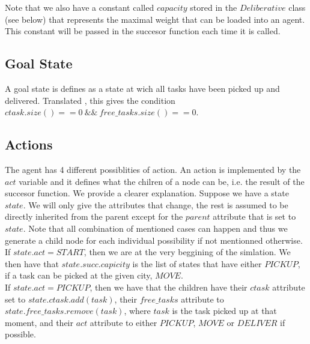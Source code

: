 \documentclass[11pt]{article}
\begin{document}
Note that we also have a constant called $capacity$ stored in the $Deliberative$ class (see below) that represents the maximal weight that can be loaded into an agent. This constant will be passed in the succesor function each time it is called.

\subsection{Goal State}
A goal state is defines as a state at wich all tasks have been picked up and delivered. Translated , this gives the condition $ctask.size() == 0\ \&\&\ free\_tasks.size() == 0$. 

\subsection{Actions}
The agent has 4 different possiblities of action. An action is implemented by the $act$ variable and it defines what the chilren of a node can be, i.e. the result of the succesor function. We provide a clearer explanation. Suppose we have a state $state$. We will only give the attributes that change, the rest is assumed to be directly inherited from the parent except for the $parent$ attribute that is set to $state$. Note that all combination of mentioned cases can happen and thus we generate a child node for each individual possibility if not mentionned otherwise.\\
If $state.act = START$, then we are at the very beggining of the simlation. We then have that $state.succ.capicity$ is the list of states that have either $PICKUP$, if a task can be picked at the given city, $MOVE$.\\
If $state.act = PICKUP$, then we have that the children have their $ctask$ attribute set to $state.ctask.add(task)$, their $free\_tasks$ attribute to $state.free\_tasks.remove(task)$, where $task$ is the task picked up at that moment, and their $act$ attribute to either $PICKUP$, $MOVE$ or $DELIVER$ if possible.\\
\end{document}
